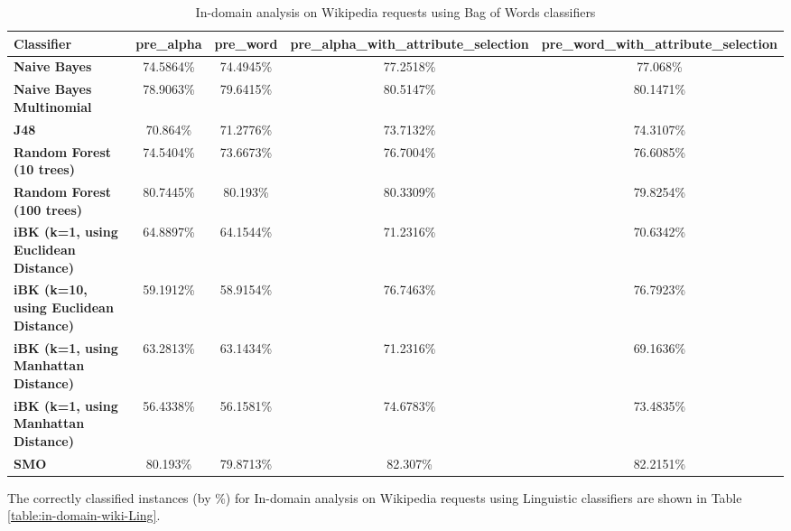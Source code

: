 \documentclass[conference]{IEEEtran}
\begin{document}
\begin{table*}[htbp]
\caption{In-domain analysis on Wikipedia requests using Bag of Words classifiers }
\centering
\vspace{5pt}
\begin{tabular}{|l|c|c|c|c|}
\hline
\textbf{Classifier} & \textbf{pre\_alpha} & \textbf{pre\_word} & \textbf{pre\_alpha\_with\_attribute\_selection} & \textbf{pre\_word\_with\_attribute\_selection} \\
\hline\hline
\textbf{Naive Bayes} & 74.5864\% & 74.4945\% & 77.2518\% & 77.068\% \\ 
\hline
\textbf{Naive Bayes Multinomial} & 78.9063\% & 79.6415\% & 80.5147\% & 80.1471\% \\ 
\hline
\textbf{J48} & 70.864\% & 71.2776\% & 73.7132\% & 74.3107\% \\ 
\hline
\textbf{Random Forest (10 trees)} & 74.5404\% & 73.6673\% & 76.7004\% & 76.6085\% \\ 
\hline
\textbf{Random Forest (100 trees)} & 80.7445\% & 80.193\% & 80.3309\% & 79.8254\% \\ 
\hline
\textbf{iBK (k=1, using Euclidean Distance)} & 64.8897\% & 64.1544\% & 71.2316\% & 70.6342\% \\ 
\hline
\textbf{iBK (k=10, using Euclidean Distance)} & 59.1912\% & 58.9154\% & 76.7463\% & 76.7923\% \\ 
\hline
\textbf{iBK (k=1, using Manhattan Distance)} & 63.2813\% & 63.1434\% & 71.2316\% & 69.1636\% \\ 
\hline
\textbf{iBK (k=1, using Manhattan Distance)} & 56.4338\% & 56.1581\% & 74.6783\% & 73.4835\% \\ 
\hline
\textbf{SMO} & 80.193\% & 79.8713\% & 82.307\% & 82.2151\% \\ 
\hline
\hline
\end{tabular}
\label{table:in-domain-wiki-BOW}
\end{table*}

The correctly classified instances (by \%) for In-domain analysis on Wikipedia requests using Linguistic classifiers are shown in Table \ref{table:in-domain-wiki-Ling}.
\end{document}
